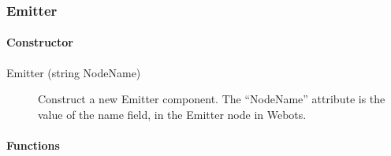 \subsubsection{Emitter}

\paragraph{Constructor}

\noindent
\begin{description}
\item[{Emitter (string NodeName)}] Construct a new Emitter
  component. The ``NodeName'' attribute is the value of the name
  field, in the Emitter node in Webots.

\end{description}

\paragraph{Functions}

